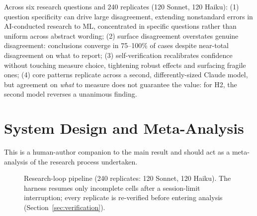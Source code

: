 \documentclass{article}
\begin{document}
Across six research questions and 240 replicates (120 Sonnet, 120 Haiku): (1) question
specificity can drive large disagreement, extending nonstandard errors \citep{menkveld2024}
in AI-conducted research \citep{gaoxiao2026} to ML, concentrated in specific questions
rather than uniform across abstract wording; (2) surface disagreement overstates genuine
disagreement: conclusions converge in
75--100\% of cases despite near-total disagreement on what to report; (3) self-verification
recalibrates confidence without touching measure choice, tightening robust effects and
surfacing fragile ones; (4) core patterns replicate across a second, differently-sized
Claude model, but agreement on \emph{what} to measure does not guarantee the value: for H2,
the second model reverses a unanimous finding.

\clearpage
\section{System Design and Meta-Analysis}
This is a human-author companion to the main result and should act as a meta-analysis of
the research process undertaken.

\begin{figure}[h]
\centering
{}
\caption{Research-loop pipeline (240 replicates: 120 Sonnet, 120 Haiku). The harness
resumes only incomplete cells after a session-limit interruption; every replicate is
re-verified before entering analysis (Section~\ref{sec:verification}).}
\label{fig:pipeline}
\end{figure}
\end{document}
